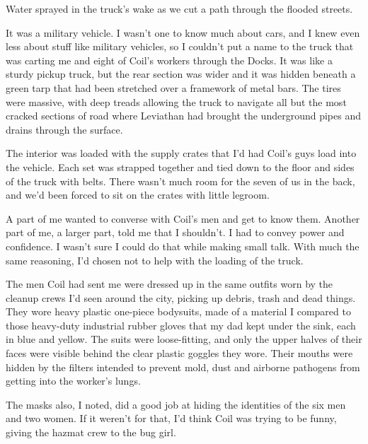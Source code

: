 





Water sprayed in the truck's wake as we cut a path through the flooded streets.



It was a military vehicle.  I wasn't one to know much about cars, and I knew even less about stuff like military vehicles, so I couldn't put a name to the truck that was carting me and eight of Coil's workers through the Docks.  It was like a sturdy pickup truck, but the rear section was wider and it was hidden beneath a green tarp that had been stretched over a framework of metal bars.  The tires were massive, with deep treads allowing the truck to navigate all but the most cracked sections of road where Leviathan had brought the underground pipes and drains through the surface.



The interior was loaded with the supply crates that I'd had Coil's guys load into the vehicle.  Each set was strapped together and tied down to the floor and sides of the truck with belts.  There wasn't much room for the seven of us in the back, and we'd been forced to sit on the crates with little legroom.



A part of me wanted to converse with Coil's men and get to know them.  Another part of me, a larger part, told me that I shouldn't.  I had to convey power and confidence.  I wasn't sure I could do that while making small talk.  With much the same reasoning, I'd chosen not to help with the loading of the truck.



The men Coil had sent me were dressed up in the same outfits worn by the cleanup crews I'd seen around the city, picking up debris, trash and dead things.  They wore heavy plastic one-piece bodysuits, made of a material I compared to those heavy-duty industrial rubber gloves that my dad kept under the sink, each in blue and yellow.  The suits were loose-fitting, and only the upper halves of their faces were visible behind the clear plastic goggles they wore.  Their mouths were hidden by the filters intended to prevent mold, dust and airborne pathogens from getting into the worker's lungs.



The masks also, I noted, did a good job at hiding the identities of the six men and two women.  If it weren't for that, I'd think Coil was trying to be funny, giving the hazmat crew to the bug girl.



